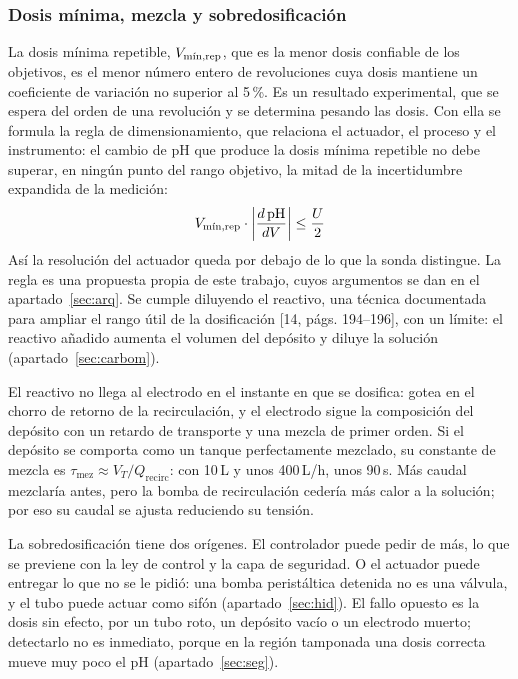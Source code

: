 \subsubsection{Dosis mínima, mezcla y sobredosificación}\label{sec:dosismin}
La dosis mínima repetible, $\Vmin$, que es la menor dosis confiable de los objetivos, es el menor número entero de revoluciones cuya dosis mantiene un coeficiente de variación no superior al 5\,\%. Es un resultado experimental, que se espera del orden de una revolución y se determina pesando las dosis. Con ella se formula la regla de dimensionamiento, que relaciona el actuador, el proceso y el instrumento: el cambio de pH que produce la dosis mínima repetible no debe superar, en ningún punto del rango objetivo, la mitad de la incertidumbre expandida de la medición:
\begin{equation}
\Vmin\cdot\left|\frac{d\,\mathrm{pH}}{dV}\right|\le\frac{U}{2}\label{eq:regla}
\end{equation}
Así la resolución del actuador queda por debajo de lo que la sonda distingue. La regla es una propuesta propia de este trabajo, cuyos argumentos se dan en el apartado~\ref{sec:arq}. Se cumple diluyendo el reactivo, una técnica documentada para ampliar el rango útil de la dosificación [14, págs. 194–196], con un límite: el reactivo añadido aumenta el volumen del depósito y diluye la solución (apartado~\ref{sec:carbom}).

El reactivo no llega al electrodo en el instante en que se dosifica: gotea en el chorro de retorno de la recirculación, y el electrodo sigue la composición del depósito con un retardo de transporte y una mezcla de primer orden. Si el depósito se comporta como un tanque perfectamente mezclado, su constante de mezcla es $\tau_{\text{mez}}\approx V_T/Q_{\text{recirc}}$: con 10\,L y unos 400\,L/h, unos 90\,s. Más caudal mezclaría antes, pero la bomba de recirculación cedería más calor a la solución; por eso su caudal se ajusta reduciendo su tensión.

La sobredosificación tiene dos orígenes. El controlador puede pedir de más, lo que se previene con la ley de control y la capa de seguridad. O el actuador puede entregar lo que no se le pidió: una bomba peristáltica detenida no es una válvula, y el tubo puede actuar como sifón (apartado~\ref{sec:hid}). El fallo opuesto es la dosis sin efecto, por un tubo roto, un depósito vacío o un electrodo muerto; detectarlo no es inmediato, porque en la región tamponada una dosis correcta mueve muy poco el pH (apartado~\ref{sec:seg}).

